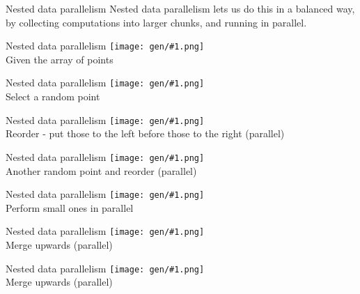 \documentclass{beamer}
\newcommand{\bs}{\symbol{`\\}}
\newcommand{\lam}[1]{\bs{}{#1} ->}
\newcommand{\fr}[1]{\begin{frame}[fragile]{#1}}
\newcommand{\im}[1]{\texttt{[image: gen/\#1.png]} \\ }
\begin{document}
\fr{Nested data parallelism}
Nested data parallelism lets us do this in a balanced way,
by collecting computations into larger chunks, and running in parallel.
\end{frame}

\fr{Nested data parallelism}
\im{ndp-01}
Given the array of points
\end{frame}

\fr{Nested data parallelism}
\im{ndp-02}
Select a random point
\end{frame}

\fr{Nested data parallelism}
\im{ndp-03}
Reorder - put those to the left before those to the right (parallel)
\end{frame}

\fr{Nested data parallelism}
\im{ndp-04}
Another random point and reorder (parallel)
\end{frame}

\fr{Nested data parallelism}
\im{ndp-05}
Perform small ones in parallel
\end{frame}

\fr{Nested data parallelism}
\im{ndp-06}
Merge upwards (parallel)
\end{frame}

\fr{Nested data parallelism}
\im{ndp-07}
Merge upwards (parallel)
\end{frame}




% 
% 
\end{document}
